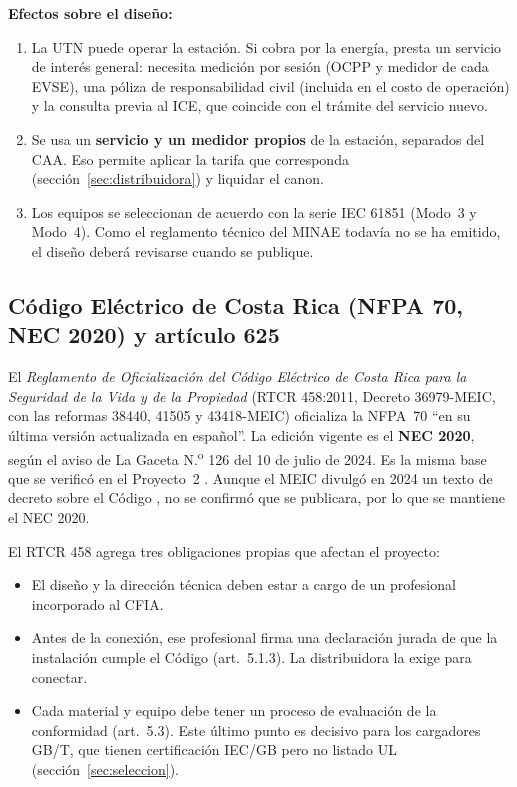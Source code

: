 \textbf{Efectos sobre el diseño:}
\begin{enumerate}[label=(\alph*)]
\item La UTN puede operar la estación. Si cobra por la energía, presta un servicio de interés general: necesita medición por sesión (OCPP y medidor de cada EVSE), una póliza de responsabilidad civil (incluida en el costo de operación) y la consulta previa al ICE, que coincide con el trámite del servicio nuevo.
\item Se usa un \textbf{servicio y un medidor propios} de la estación, separados del CAA. Eso permite aplicar la tarifa que corresponda (sección~\ref{sec:distribuidora}) y liquidar el canon.
\item Los equipos se seleccionan de acuerdo con la serie IEC 61851 (Modo~3 y Modo~4). Como el reglamento técnico del MINAE todavía no se ha emitido, el diseño deberá revisarse cuando se publique.
\end{enumerate}

\subsection{Código Eléctrico de Costa Rica (NFPA 70, NEC 2020) y artículo 625}
\label{sec:nec}
El \emph{Reglamento de Oficialización del Código Eléctrico de Costa Rica para la Seguridad de la Vida y de la Propiedad} (RTCR 458:2011, Decreto 36979-MEIC, con las reformas 38440, 41505 y 43418-MEIC) oficializa la NFPA~70 ``en su última versión actualizada en español''. La edición vigente es el \textbf{NEC 2020}, según el aviso de La Gaceta N.\textsuperscript{o} 126 del 10 de julio de 2024. Es la misma base que se verificó en el Proyecto~2 \cite{rtcr458,gacetaNEC}. Aunque el MEIC divulgó en 2024 un texto de decreto sobre el Código \cite{meic2024}, no se confirmó que se publicara, por lo que se mantiene el NEC 2020.

El RTCR 458 agrega tres obligaciones propias que afectan el proyecto:
\begin{itemize}
\item El diseño y la dirección técnica deben estar a cargo de un profesional incorporado al CFIA.
\item Antes de la conexión, ese profesional firma una declaración jurada de que la instalación cumple el Código (art.~5.1.3). La distribuidora la exige para conectar.
\item Cada material y equipo debe tener un proceso de evaluación de la conformidad (art.~5.3). Este último punto es decisivo para los cargadores GB/T, que tienen certificación IEC/GB pero no listado UL (sección~\ref{sec:seleccion}).
\end{itemize}

